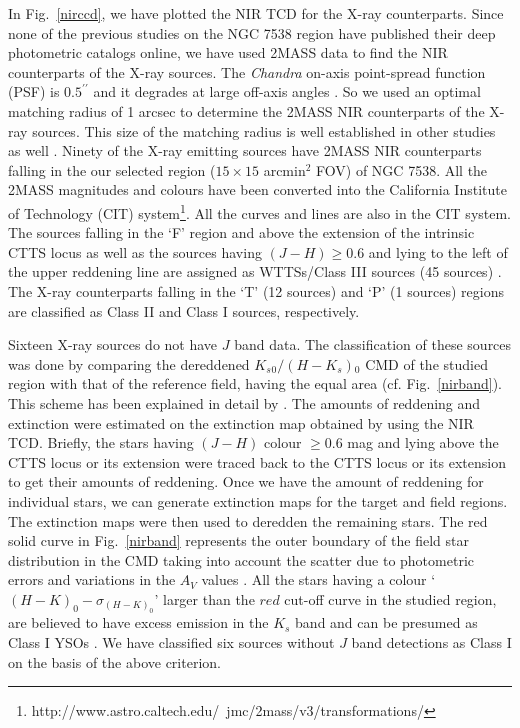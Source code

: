 \documentclass[a4paper,fleqn,usenatbib,useAMS]{mnras}
\begin{document}
In Fig.~\ref{nirccd}, we have plotted the NIR TCD  for the X-ray counterparts.
Since none of the previous studies on the NGC 7538 region \citep[cf.][]{2004ApJ...616.1042O,2014MNRAS.443.3218M,2014MNRAS.439.3719C} 
have published their deep photometric catalogs online, we have used 2MASS data to find 
the NIR counterparts of the X-ray sources.
The {\it Chandra} on-axis point-spread function (PSF) is $0.5^{\prime\prime}$ and it degrades at
large off-axis angles \citep[see e.g.][]{2005ApJS..160..319G, 0004-637X-714-2-1582}. So we used
an optimal matching radius of 1 arcsec to determine the 2MASS NIR counterparts of the
X-ray sources. This size of the matching radius is well established in other studies as well
\citep[see e.g.][]{2002ApJ...574..258F, 2007ApJS..168..100W}. 
Ninety of the X-ray emitting sources have 2MASS NIR counterparts falling 
in the our selected region ($15\times15$ arcmin$^2$ FOV) of NGC 7538.
All the 2MASS magnitudes and colours have been converted into the California Institute of
Technology (CIT) system\footnote{http://www.astro.caltech.edu/~jmc/2mass/v3/transformations/}.
All the curves and lines are also in the CIT system. 
The sources falling in the `F' region and above the
extension of the intrinsic CTTS locus as well as the sources having $(J-H) \geq 0.6$ and
lying to the left of the upper reddening line  
are assigned as WTTSs/Class III sources (45 sources) \citep[see, e.g.,][]{2008MNRAS.384.1675J, 2008MNRAS.383.1241P, 2012PASJ...64..107S, 2014A&A...567A.109K}.
The X-ray counterparts  falling in the `T' (12 sources) and `P' (1 sources) regions are
classified as Class II and Class I sources, respectively.

Sixteen X-ray sources do not have $J$ band data.  The classification of these sources was done
by comparing the dereddened  $K_s{_0}/(H-K_s){_0}$ CMD of the studied region with that of the reference field, 
having the equal area (cf. Fig.~\ref{nirband}).
This scheme has been explained in detail by \citet{2014A&A...567A.109K}.
The amounts of reddening and extinction were estimated on the extinction map obtained by using the  NIR TCD.
Briefly, the stars having $(J-H)$ colour $ \ge 0.6$ mag and lying above the
CTTS locus or its extension were traced back to the CTTS locus or its extension to get their 
amounts of reddening.
Once we have the amount of reddening for individual stars, we can generate 
extinction maps for the target and field regions. The extinction maps were then used to deredden the remaining stars.
The red solid curve in Fig.~\ref{nirband} represents the outer boundary of the field star distribution 
in the CMD taking into account the scatter due to photometric errors and variations in the $A_V$  
values \citep[see for details,][]{2014A&A...567A.109K}.
All the stars having a colour `$(H-K)_0 - \sigma_{(H-K)_0}$' larger than the $red$ cut-off curve
in the studied region, are believed to have excess emission in the $K_s$ band and can be presumed as 
Class I YSOs \citep[see also][]{2004ApJ...616.1042O,2012ApJ...759...48M, 2014A&A...567A.109K}. 
 We have classified six sources without $J$ band detections  as Class I on the basis of the above criterion.
\end{document}
